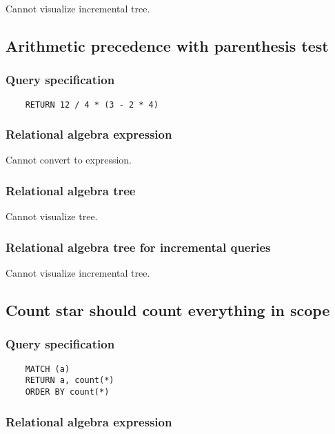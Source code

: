 	Cannot visualize incremental tree.
	\subsection{Arithmetic precedence with parenthesis test}

	\subsubsection*{Query specification}

	\begin{lstlisting}
	RETURN 12 / 4 * (3 - 2 * 4)
	\end{lstlisting}


	\subsubsection*{Relational algebra expression}

	Cannot convert to expression.

	\subsubsection*{Relational algebra tree}

	Cannot visualize tree.

	\subsubsection*{Relational algebra tree for incremental queries}

	Cannot visualize incremental tree.
	\subsection{Count star should count everything in scope}

	\subsubsection*{Query specification}

	\begin{lstlisting}
	MATCH (a)
	RETURN a, count(*)
	ORDER BY count(*)
	\end{lstlisting}


	\subsubsection*{Relational algebra expression}

